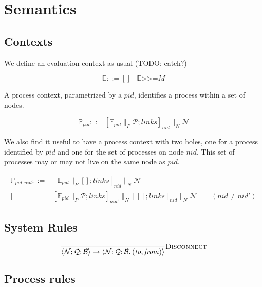 \documentclass{article}
\newcommand{\sBind}[2]{{#1} \mathrel{\texttt{>}\!\!\texttt{>}\!\texttt{=}} {#2}}
\newcommand{\sParP}{\mathrel{{\parallel}_P}}
\newcommand{\sParN}{\mathrel{{\parallel}_N}}
\newcommand{\sProc}[2]{{#1}_{#2}}
\newcommand{\sPid}{\ensuremath{\mathit{pid}}}
\newcommand{\sNid}{\ensuremath{\mathit{nid}}}
\newcommand{\sLinks}{\ensuremath{\mathit{links}}}
\newcommand{\sNode}[3]{\left[{#1} ; {#2}\right]_{#3}}
\newcommand{\sSystem}[3]{\left\langle #1 ; #2 ; #3 \right\rangle}
\newcommand{\sNodes}{\mathcal{N}}
\newcommand{\sQueue}{\mathcal{Q}}
\newcommand{\sProcesses}{\mathcal{P}}
\newcommand{\sBlacklist}{\mathcal{B}}
\newcommand{\sCtxt}[1]{\mathbb{#1}}
\newcommand{\OR}{\mathrel{|}}
\begin{document}
\section{Semantics}

\subsection{Contexts}

We define an evaluation context as usual (TODO: catch?)

\begin{equation*}
\sCtxt{E} ::= [] \OR \sBind{\sCtxt{E}}{M}
\end{equation*}

A process context, parametrized by a \sPid, identifies a process within a set
of nodes. 

\begin{equation*}
\sCtxt{P}_\sPid ::= \sNode{\sProc{\sCtxt{E}}{pid} \sParP \sProcesses}{\sLinks}{\sNid} \sParN \sNodes 
\end{equation*}

We also find it useful to have a process context with two holes, one for a
process identified by \sPid{} and one for the set of processes on node \sNid.
This set of processes may or may not live on the same node as \sPid. 

\begin{equation*}
\begin{array}{rl}
\sCtxt{P}_{\sPid,\sNid} ::= & 
  \sNode{\sProc{\sCtxt{E}}{pid} \sParP []}{\sLinks}{\sNid} \sParN \sNodes \\[1em]
\OR & 
  \sNode{\sProc{\sCtxt{E}}{pid} \sParP \sProcesses}{\sLinks}{\sNid'} \sParN \sNode{[]}{\sLinks}{\sNid} \sParN \sNodes 
    \qquad
  (\sNid \neq \sNid')
\end{array}
\end{equation*}

\subsection{System Rules}

\begin{equation*}
\frac{
}{
  \sSystem{\sNodes}{\sQueue}{\sBlacklist}
\rightarrow
  \sSystem{\sNodes}{\sQueue}{\sBlacklist, (\mathit{to}, \mathit{from})}
} \textsc{Disconnect}
\end{equation*}

\subsection{Process rules}
\end{document}
